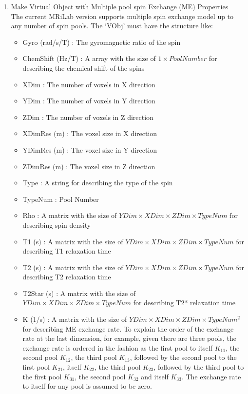 \documentclass{book}%
\begin{document}
\begin{enumerate}
\item Make Virtual Object with Multiple pool spin Exchange (ME) Properties\\

The current MRiLab version supports multiple spin exchange model up to any number of spin pools. The `VObj' must have the structure like:

\begin{itemize}
	\item Gyro (rad/s/T) : The gyromagnetic ratio of the spin
	\item ChemShift (Hz/T) : A array with the size of $1 \times Pool Number $ for describing the chemical shift of the spins
	\item XDim : The number of voxels in X direction
	\item YDim : The number of voxels in Y direction
	\item ZDim : The number of voxels in Z direction
	\item XDimRes (m) : The voxel size in X direction
	\item YDimRes (m) : The voxel size in Y direction
	\item ZDimRes (m) : The voxel size in Z direction
	\item Type : A string for describing the type of the spin
	\item TypeNum : Pool Number
	\item Rho : A matrix with the size of $ YDim \times XDim \times ZDim \times TypeNum $ for describing spin density
	\item T1 (s) : A matrix with the size of $ YDim \times XDim \times ZDim \times TypeNum $ for describing T1 relaxation time
	\item T2 (s) : A matrix with the size of $ YDim \times XDim \times ZDim \times TypeNum $ for describing T2 relaxation time
	\item T2Star (s) : A matrix with the size of $ YDim \times XDim \times ZDim \times TypeNum $ for describing T2* relaxation time
	\item K (1/s) : A matrix with the size of $ YDim \times XDim \times ZDim \times TypeNum^2 $ for describing ME exchange rate. To explain the order of the exchange rate at the last dimension, for example, given there are three pools, the exchange rate is ordered in the fashion as the first pool to itself $K_{11}$, the second pool $K_{12}$, the third pool $K_{13}$, followed by the second pool to the first pool $K_{21}$, itself $K_{22}$, the third pool $K_{23}$, followed by the third pool to the first pool $K_{31}$, the second pool $K_{32}$ and itself $K_{33}$. The exchange rate to itself for any pool is assumed to be zero.
\end{itemize}


\end{enumerate}
\end{document}
